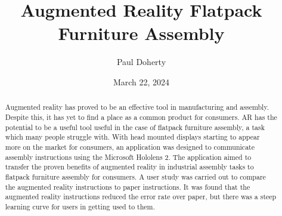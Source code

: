\documentclass{l4proj}
\begin{document}
\title{Augmented Reality Flatpack Furniture Assembly}
\author{Paul Doherty}
\date{March 22, 2024}

\maketitle

\begin{abstract}
    Augmented reality has proved to be an effective tool in manufacturing and assembly. Despite this, it has yet to find a place as a common product for consumers. AR has the potential to be a useful tool useful in the case of flatpack furniture assembly, a task which many people struggle with. With head mounted displays starting to appear more on the market for consumers, an application was designed to communicate assembly instructions using the Microsoft Hololens 2. The application aimed to transfer the proven benefits of augmented reality in industrial assembly tasks to flatpack furniture assembly for consumers. A user study was carried out to compare the augmented reality instructions to paper instructions. It was found that the augmented reality instructions reduced the error rate over paper, but there was a steep learning curve for users in getting used to them.
\end{abstract}


%
%
%

\def\consentname {Paul Kieran Doherty} %
\def\consentdate {13 February 2024} %

\educationalconsent

\tableofcontents
\end{document}
